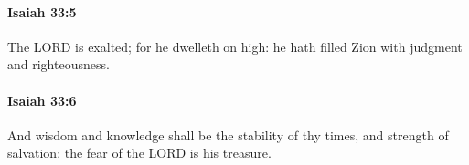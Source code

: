 		\paragraph{Isaiah 33:5} %
			\label{ISAIAH-33-5}

			The LORD is exalted; for he dwelleth on high: he hath filled Zion with judgment and righteousness.


		\paragraph{Isaiah 33:6} %
			\label{ISAIAH-33-6}

			And wisdom and knowledge shall be the stability of thy times, and strength of salvation: the fear of the LORD is his treasure.



